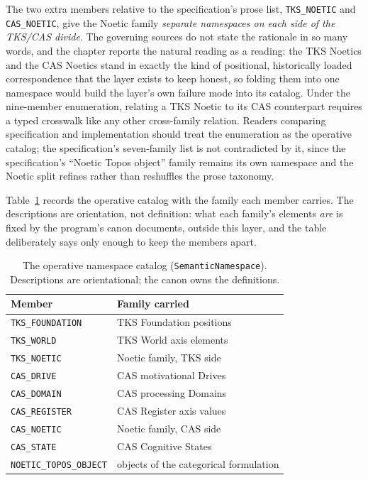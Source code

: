 The two extra members relative to the specification's prose list,
\texttt{TKS\_NOETIC} and \texttt{CAS\_NOETIC}, give the Noetic
family \emph{separate namespaces on each side of the TKS/CAS
divide}. The governing sources do not state the rationale in so
many words, and the chapter reports the natural reading as a
reading: the TKS Noetics and the CAS Noetics stand in exactly the
kind of positional, historically loaded correspondence that the
layer exists to keep honest, so folding them into one namespace
would build the layer's own failure mode into its catalog. Under
the nine-member enumeration, relating a TKS Noetic to its CAS
counterpart requires a typed crosswalk like any other cross-family
relation. Readers comparing specification and implementation
should treat the enumeration as the operative catalog; the
specification's seven-family list is not contradicted by it, since
the specification's ``Noetic Topos object'' family remains its own
namespace and the Noetic split refines rather than reshuffles the
prose taxonomy.

Table~\ref{ch03:tab-namespaces} records the operative catalog with
the family each member carries. The descriptions are orientation,
not definition: what each family's elements \emph{are} is fixed by
the program's canon documents, outside this layer, and the table
deliberately says only enough to keep the members apart.

\begin{table}[htbp]
\centering
\caption{The operative namespace catalog
(\texttt{SemanticNamespace}). Descriptions are orientational; the
canon owns the definitions.}
\label{ch03:tab-namespaces}
\begin{tabular}{@{}ll@{}}
\toprule
Member & Family carried \\
\midrule
\texttt{TKS\_FOUNDATION} & TKS Foundation positions \\
\texttt{TKS\_WORLD} & TKS World axis elements \\
\texttt{TKS\_NOETIC} & Noetic family, TKS side \\
\texttt{CAS\_DRIVE} & CAS motivational Drives \\
\texttt{CAS\_DOMAIN} & CAS processing Domains \\
\texttt{CAS\_REGISTER} & CAS Register axis values \\
\texttt{CAS\_NOETIC} & Noetic family, CAS side \\
\texttt{CAS\_STATE} & CAS Cognitive States \\
\texttt{NOETIC\_TOPOS\_OBJECT} & objects of the categorical
formulation \\
\bottomrule
\end{tabular}
\end{table}

